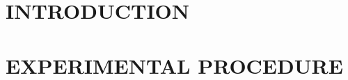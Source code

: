 \documentclass[a4paper,12pt,openany]{report} %
\begin{document}
	
	


	\setcounter{page}{1}
	

\setcounter{tocdepth}{0}
\titleformat{\chapter}[display]{\normalfont\centering}{ }{0pt}{\normalfont}
\titleformat{\section}[display]{\normalfont\centering}{ }{0pt}{\normalfont}
\titlespacing*{\chapter}{0pt}{0pt}{0pt}
		
		\chapter{INTRODUCTION} 
		\label{chap:Intro}
		

		\chapter{EXPERIMENTAL PROCEDURE}
		\label{chap:Methods} 
		





		\begin{refsection}
			
			\label{chap:HSR}
			\singlespacing
			\printbibliography[title = Chapter References\\]
			\doublespacing
		\end{refsection}
	
		\begin{refsection}
			
			\label{chap:ODSLACS}
			\singlespacing
			\printbibliography[title = Chapter References\\]
			\doublespacing
		\end{refsection}


		\begin{refsection}
			
			\label{chap:Isosurfaces}
			\singlespacing
			\printbibliography[title = Chapter References\\]
			\doublespacing
		\end{refsection}
\end{document}
